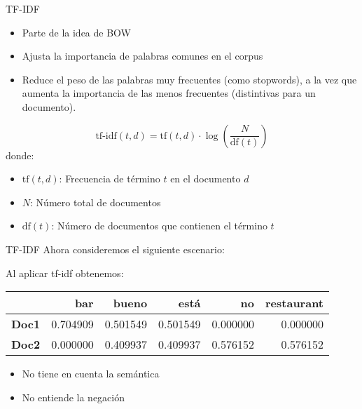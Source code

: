 \documentclass{beamer}
\begin{document}
\begin{frame}{TF-IDF}

	\begin{itemize}
		\item Parte de la idea de BOW
		\item Ajusta la importancia de palabras comunes en el corpus
		\item Reduce el peso de las palabras muy frecuentes (como stopwords), a la vez que aumenta la importancia de las menos frecuentes (distintivas para un documento).
		
	\end{itemize}
	\vspace{2em}
	\[
	\text{tf-idf}(t,d) = \text{tf}(t,d) \cdot \log\left(\frac{N}{\text{df}(t)}\right)
	\]
	donde:
	\begin{itemize}
		\item \( \text{tf}(t,d) \): Frecuencia de término \(t\) en el documento \(d\)
		\item \( N \): Número total de documentos
		\item \( \text{df}(t) \): Número de documentos que contienen el término \(t\)
	\end{itemize}

\end{frame}

\begin{frame}{TF-IDF}
Ahora consideremos el siguiente escenario:



\vspace{0.9 em}
Al aplicar tf-idf obtenemos:
\begin{tabular}{lrrrrr}
\toprule
         & \textbf{bar} & \textbf{bueno} & \textbf{está} & \textbf{no} & \textbf{restaurant} \\
\midrule
\textbf{Doc1} & 0.704909 & 0.501549 & 0.501549 & 0.000000 & 0.000000 \\
\textbf{Doc2} & 0.000000 & 0.409937 & 0.409937 & 0.576152 & 0.576152 \\
\bottomrule
\end{tabular}

\vspace{2em}
\begin{itemize}
		\item No tiene en cuenta la semántica
		\item No entiende la negación
\end{itemize}

\end{frame}
\end{document}
